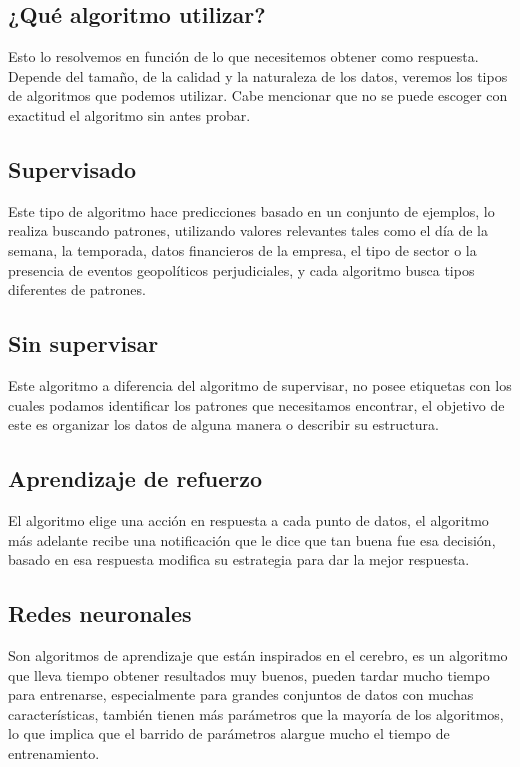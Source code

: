 \documentclass[a4paper,openright,11pt]{article}
\begin{document}
\subsection{¿Qué algoritmo utilizar?}
Esto lo resolvemos en función de lo que necesitemos obtener como respuesta. Depende del tamaño, de la calidad y la naturaleza de los datos, veremos los tipos de algoritmos que podemos utilizar. Cabe mencionar que no se puede escoger con exactitud el algoritmo sin antes probar.

\subsection{Supervisado}
Este tipo de algoritmo hace predicciones basado en un conjunto de ejemplos, lo realiza buscando patrones, utilizando valores relevantes tales como el día de la semana, la temporada, datos financieros de la empresa, el tipo de sector o la presencia de eventos geopolíticos perjudiciales, y cada algoritmo busca tipos diferentes de patrones. 

\subsection{Sin supervisar}
Este algoritmo a diferencia del algoritmo de supervisar, no posee etiquetas con los cuales podamos identificar los patrones que necesitamos encontrar, el objetivo de este es organizar los datos de alguna manera o describir su estructura.

\subsection{Aprendizaje de refuerzo}
El algoritmo elige una acción en respuesta a cada punto de datos, el algoritmo más adelante recibe una notificación que le dice que tan buena fue esa decisión, basado en esa respuesta modifica su estrategia para dar la mejor respuesta. 

\subsection{Redes neuronales}
Son algoritmos de aprendizaje que están inspirados en el cerebro, es un algoritmo que lleva tiempo obtener resultados muy buenos,  pueden tardar mucho tiempo para entrenarse, especialmente para grandes conjuntos de datos con muchas características, también tienen más parámetros que la mayoría de los algoritmos, lo que implica que el barrido de parámetros alargue mucho el tiempo de entrenamiento. 


\pagestyle{fancy}
\end{document}
